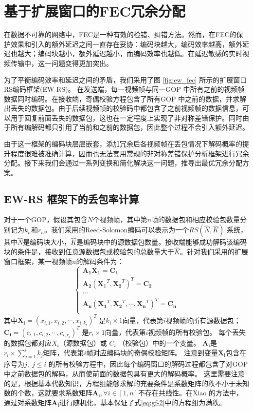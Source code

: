 \section{基于扩展窗口的FEC冗余分配}
在数据不可靠的网络中，FEC是一种有效的检错、纠错方法。然而，在FEC的保护效果和引入的额外延迟之间一直存在妥协：编码块越大，编码效率越高，额外延迟也越大；编码块越小，额外延迟越小，而编码效率也越低。在延迟敏感的实时视频传输中，这一问题变得更加突出。

为了平衡编码效率和延迟之间的矛盾，我们采用了图 \ref{fig:ew_fec} 所示的扩展窗口RS编码框架(EW-RS)。 在发送端，每一视频帧与同一GOP 中所有之前的视频帧数据同时编码。在接收端，奇偶校验方程包含了所有GOP 中之前的数据，并求解出丢失的数据包。由于后续视频帧的校验码中都包含了之前视频帧的数据信息，可以用于回复前面丢失的数据包，这也在一定程度上实现了非对称差错保护。同时由于所有编解码都只引用了当前和之前的数据包，因此整个过程不会引入额外延迟。

由于这一框架的编码块层层嵌套，添加冗余后各视频帧在丢包情况下解码概率的提升程度很难被准确计算，因而也无法套用常规的非对称差错保护分析框架进行冗余分配。接下来我们会通过一系列变换和简化解决这一问题，推导出最优冗余分配方案。

    \subsection{EW-RS 框架下的丢包率计算}
    对于一个GOP，假设其包含$N$个视频帧，其中第$n$帧的数据包和相应校验包数量分别记为$k_n$和$r_n$。我们采用的Reed-Solomon编码可以表示为一个$RS(\hat{N},\hat{K})$ \cite{wicker1999reed} 系统，其中$\hat{N}$是编码块大小，$\hat{K}$是编码块中的源数据包数量。接收端能够成功解码该编码块的条件是，接收到任意源数据包或校验包的总数量大于$\hat{K}$。针对我们采用的扩展窗口框架，某一视频帧$n$的解码条件为：
    \begin{equation}\label{eq:gf-2}
      \left\{ \begin{array}{l}
        \mathbf{A_{1}}\mathbf{X_1} = \mathbf{C_1}\\
        \mathbf{A_{2}}(\mathbf{X_1}^T, \mathbf{X_2}^T)^T= \mathbf{C_2}\\
        \cdots\\
        \mathbf{A_{n}}(\mathbf{X_1}^T,\mathbf{X_2}^T,\cdots,\mathbf{X_{n}}^T)^T = \mathbf{C_{n}}\\
      \end{array} \right.
    \end{equation}
    其中$\mathbf{X_i}=(x_{i,1},x_{i,2},\cdots,x_{i,k_i})^T$ 是$k_i \times 1$向量，代表第$i$视频帧的所有源数据包；$\mathbf{C_i}=(c_{i,1},c_{i,2},\cdots,c_{i,r_i})^T$ 是$r_i \times 1$向量，代表第$i$视频帧的所有校验包。
    每个丢失的数据包都对应$X_i$（源数据包）或 $C_i$ （校验包）中的一个变量。
    $\mathbf{A_i}$是$r_i \times \sum_{j=1}^{i}k_j$矩阵，代表第$i$帧对应编码块的奇偶校验矩阵。
    注意到变量$\mathbf{X_i}$包含在序号为$j,\; j \le i$ 的所有校验方程中，因此每个编码窗口的解码过程都包含了对GOP中之前数据包的解码，从而使前面的数据包具有更大的解码概率。
    这里需要注意的是，根据基本代数知识，方程组能够求解的充要条件是系数矩阵的秩不小于未知数的个数，这就要求系数矩阵$\mathbf{A_{i}}, \forall i \in [1,n]$不存在共线性。在Xiao \cite{xiao2013real}的方法中，通过对系数矩阵$\mathbf{A_{i}}$进行随机化，基本保证了式\ref{eq:gf-2}中的方程组为满秩。

